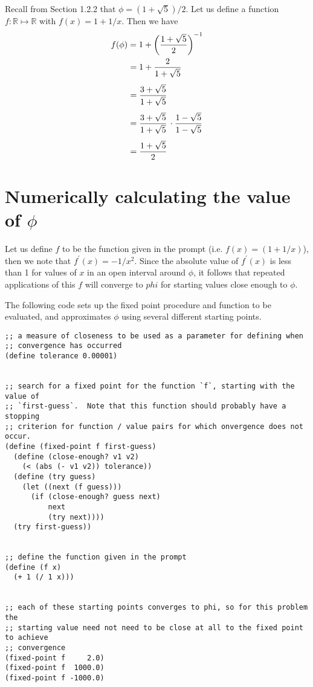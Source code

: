 \documentclass{article}
\begin{document}
\noindent Recall from Section 1.2.2 that $\phi = (1 + \sqrt{5}) / 2$.  Let us
define a function $f: \mathbb{R} \mapsto \mathbb{R}$ with $f(x) = 1 + 1 / x$.
Then we have
\begin{align*} \MoveEqLeft
  f(\phi) = 1 + \left( \frac{1 + \sqrt{5}}{2} \right)^{-1} \\
  &= 1 + \frac{2}{1 + \sqrt{5}} \\[1ex]
  &= \frac{3 + \sqrt{5}}{1 + \sqrt{5}} \\[1ex]
  &= \frac{3 + \sqrt{5}}{1 + \sqrt{5}} \,\cdot \frac{1 - \sqrt{5}}{1 - \sqrt{5}} \\[1ex]
  &= \frac{1 + \sqrt{5}}{2}
\end{align*}




\section{Numerically calculating the value of $\phi$}

Let us define $f$ to be the function given in the prompt (i.e.
$f(x) = (1 + 1/x)$), then we note that $f^{\prime}(x) = -1 / x^2$.  Since the
absolute value of $f^{\prime}(x)$ is less than 1 for values of $x$ in an open
interval around $\phi$, it follows that repeated applications of this $f$ will
converge to $phi$ for starting values close enough to $\phi$.

The following code sets up the fixed point procedure and function to be
evaluated, and approximates $\phi$ using several different starting points.

\vspace{2mm}
\begin{lstlisting}[style=scheme]
;; a measure of closeness to be used as a parameter for defining when
;; convergence has occurred
(define tolerance 0.00001)


;; search for a fixed point for the function `f`, starting with the value of
;; `first-guess`.  Note that this function should probably have a stopping
;; criterion for function / value pairs for which onvergence does not occur.
(define (fixed-point f first-guess)
  (define (close-enough? v1 v2)
    (< (abs (- v1 v2)) tolerance))
  (define (try guess)
    (let ((next (f guess)))
      (if (close-enough? guess next)
          next
          (try next))))
  (try first-guess))


;; define the function given in the prompt
(define (f x)
  (+ 1 (/ 1 x)))


;; each of these starting points converges to phi, so for this problem the
;; starting value need not need to be close at all to the fixed point to achieve
;; convergence
(fixed-point f     2.0)
(fixed-point f  1000.0)
(fixed-point f -1000.0)
\end{lstlisting}
\end{document}
